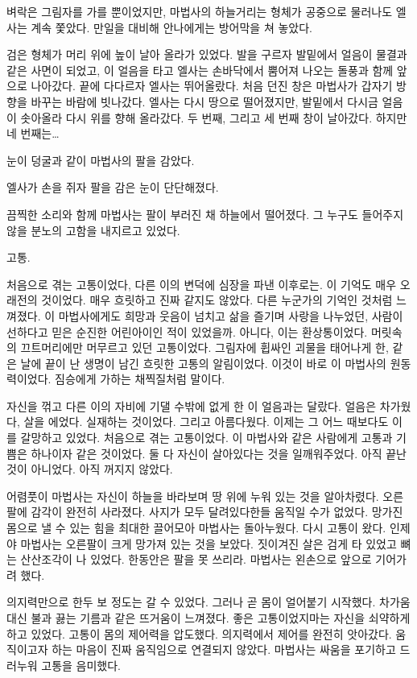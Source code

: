 벼락은 그림자를 가를 뿐이었지만, 마법사의 하늘거리는 형체가 공중으로 물러나도 엘사는 계속 쫓았다. 만일을 대비해 안나에게는 방어막을 쳐 놓았다.

검은 형체가 머리 위에 높이 날아 올라가 있었다. 발을 구르자 발밑에서 얼음이 물결과 같은 사면이 되었고, 이 얼음을 타고 엘사는 손바닥에서 뿜어져 나오는 돌풍과 함께 앞으로 나아갔다. 끝에 다다르자 엘사는 뛰어올랐다. 처음 던진 창은 마법사가 갑자기 방향을 바꾸는 바람에 빗나갔다. 엘사는 다시 땅으로 떨어졌지만, 발밑에서 다시금 얼음이 솟아올라 다시 위를 향해 올라갔다. 두 번째, 그리고 세 번째 창이 날아갔다. 하지만 네 번째는\ldots

눈이 덩굴과 같이 마법사의 팔을 감았다.

엘사가 손을 쥐자 팔을 감은 눈이 단단해졌다.

끔찍한 소리와 함께 마법사는 팔이 부러진 채 하늘에서 떨어졌다. 그 누구도 들어주지 않을 분노의 고함을 내지르고 있었다.

\textbreak

고통.

처음으로 겪는 고통이었다, 다른 이의 변덕에 심장을 파낸 이후로는. 이 기억도 매우 오래전의 것이었다. 매우 흐릿하고 진짜 같지도 않았다. 다른 누군가의 기억인 것처럼 느껴졌다. 이 마법사에게도 희망과 웃음이 넘치고 삶을 즐기며 사랑을 나누었던, 사람이 선하다고 믿은 순진한 어린아이인 적이 있었을까. 아니다, 이는 환상통이었다. 머릿속의 끄트머리에만 머무르고 있던 고통이었다. 그림자에 휩싸인 괴물을 태어나게 한, 같은 날에 끝이 난 생명이 남긴 흐릿한 고통의 알림이었다. 이것이 바로 이 마법사의 원동력이었다. 짐승에게 가하는 채찍질처럼 말이다.

자신을 꺾고 다른 이의 자비에 기댈 수밖에 없게 한 이 얼음과는 달랐다. 얼음은 차가웠다, 살을 에었다. 실재하는 것이었다. 그리고 아름다웠다. 이제는 그 어느 때보다도 이를 갈망하고 있었다. 처음으로 겪는 고통이었다. 이 마법사와 같은 사람에게 고통과 기쁨은 하나이자 같은 것이었다. 둘 다 자신이 살아있다는 것을 일깨워주었다. 아직 끝난 것이 아니었다. 아직 꺼지지 않았다.

어렴풋이 마법사는 자신이 하늘을 바라보며 땅 위에 누워 있는 것을 알아차렸다. 오른팔에 감각이 완전히 사라졌다. 사지가 모두 달려있다한들 움직일 수가 없었다. 망가진 몸으로 낼 수 있는 힘을 최대한 끌어모아 마법사는 돌아누웠다. 다시 고통이 왔다. 인제야 마법사는 오른팔이 크게 망가져 있는 것을 보았다. 짓이겨진 살은 검게 타 있었고 뼈는 산산조각이 나 있었다. 한동안은 팔을 못 쓰리라. 마법사는 왼손으로 앞으로 기어가려 했다.

의지력만으로 한두 보 정도는 갈 수 있었다. 그러나 곧 몸이 얼어붙기 시작했다. 차가움 대신 불과 끓는 기름과 같은 뜨거움이 느껴졌다. 좋은 고통이었지마는 자신을 쇠약하게 하고 있었다. 고통이 몸의 제어력을 압도했다. 의지력에서 제어를 완전히 앗아갔다. 움직이고자 하는 마음이 진짜 움직임으로 연결되지 않았다. 마법사는 싸움을 포기하고 드러누워 고통을 음미했다.

